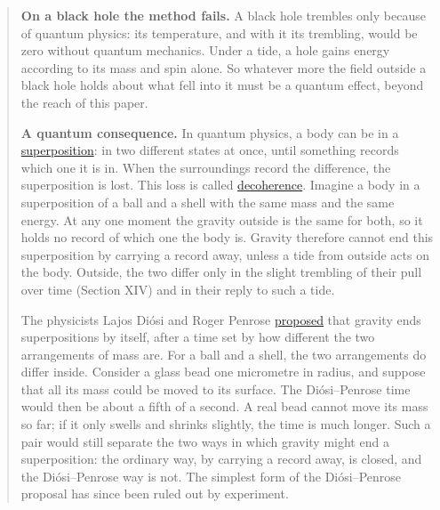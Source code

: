 \begin{quote}
\textbf{On a black hole the method fails.} A black hole trembles only because of
quantum physics: its temperature, and with it its trembling, would be zero
without quantum mechanics. Under a tide, a hole gains energy according to its
mass and spin alone. So whatever more the field outside a black hole holds
about what fell into it must be a quantum effect, beyond the reach of this
paper.

\textbf{A quantum consequence.} In quantum physics, a body can be in a
\href{https://en.wikipedia.org/wiki/Quantum_superposition}{superposition}: in
two different states at once, until something records which one it is in. When
the surroundings record the difference, the superposition is lost. This loss is
called
\href{https://en.wikipedia.org/wiki/Quantum_decoherence}{decoherence}. Imagine a
body in a superposition of a ball and a shell with the same mass and the same
energy. At any one moment the gravity outside is the same for both, so it holds no record of
which one the body is. Gravity therefore cannot end this superposition by
carrying a record away, unless a tide from outside acts on the body. Outside,
the two differ only in the slight trembling of their pull over time (Section
XIV) and in their reply to such a tide.

The physicists Lajos Di\'osi and Roger Penrose
\href{https://en.wikipedia.org/wiki/Penrose_interpretation}{proposed} that
gravity ends superpositions by itself, after a time set by how different the
two arrangements of mass are. For a ball and a shell, the two arrangements do
differ inside. Consider a glass bead one micrometre in radius, and suppose that
all its mass could be moved to its surface. The Di\'osi--Penrose time would
then be about a fifth of a second. A real bead cannot move its mass so far; if
it only swells and shrinks slightly, the time is much longer. Such a pair would
still separate the two ways in which gravity might end a superposition: the
ordinary way, by carrying a record away, is closed, and the Di\'osi--Penrose
way is not. The simplest form of the Di\'osi--Penrose proposal has since been
ruled out by experiment.
\end{quote}

